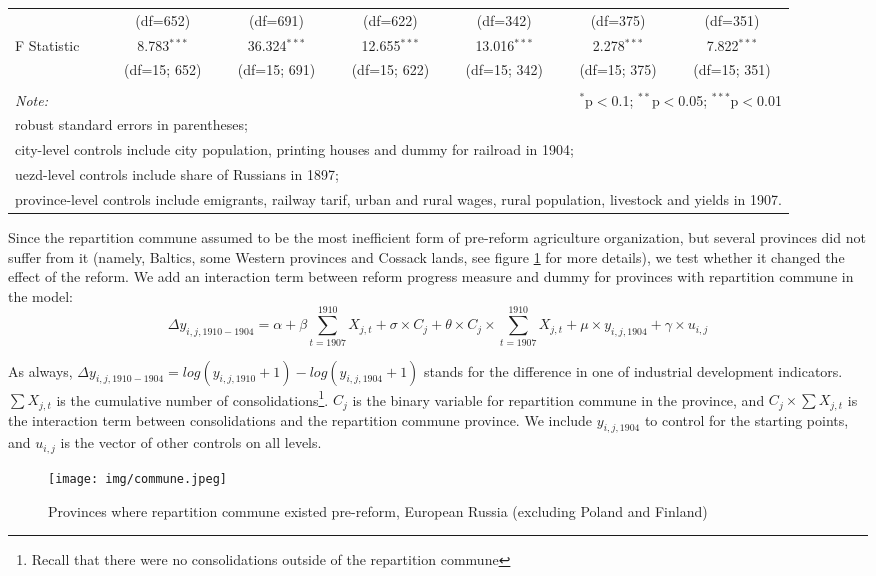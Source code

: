 \documentclass[a4paper, 12pt]{article}
\begin{document}
\begin{table}[!htbp]
{\begin{tabular}{@{\extracolsep{5pt}}lcccccc}
&(df=652)  & (df=691)  & (df=622)& (df=342) & (df=375) & (df=351) \\ 
F Statistic & 8.783$^{***}$ & 36.324$^{***}$ & 12.655$^{***}$ & 13.016$^{***}$ & 2.278$^{***}$ & 7.822$^{***}$ \\
& (df=15; 652) & (df=15; 691) & (df=15; 622) & (df=15; 342) & (df=15; 375) & (df=15; 351) \\ 
\hline 
\hline \\[-1.8ex] 
\textit{Note:}  & \multicolumn{6}{r}{$^{*}$p$<$0.1; $^{**}$p$<$0.05; $^{***}$p$<$0.01} \\ 
\multicolumn{7}{l}{robust standard errors in parentheses;} \\
\multicolumn{7}{l}{city-level controls include city population, printing houses and dummy for railroad in 1904;} \\
\multicolumn{7}{l}{uezd-level controls include share of Russians in 1897;}\\
\multicolumn{7}{l}{province-level controls include emigrants, railway tarif, urban and rural wages, rural population, livestock and yields in 1907.}
\end{tabular} 
}
\end{table} 

\noindent Since the repartition commune assumed to be the most inefficient form of pre-reform agriculture organization, but several provinces did not suffer from it (namely, Baltics, some Western provinces and Cossack lands, see figure \ref{fig:commune} for more details), we test whether it changed the effect of the reform. We add an interaction term between reform progress measure and dummy for provinces with repartition commune in the model:
\begin{equation}\label{eq:commune}
    \Delta y_{i,j,1910-1904} = \alpha + \beta \sum_{t=1907}^{1910} X_{j,t} + \sigma \times C_j + \theta \times C_j \times \sum_{t=1907}^{1910} X_{j,t} + \mu \times y_{i,j,1904}+ \gamma \times u_{i,j} 
\end{equation}

\noindent As always, $\Delta y_{i,j,1910-1904} = log(y_{i,j,1910}+1) - log(y_{i,j,1904}+1)$ stands for the difference in one of industrial development indicators. $\sum X_{j,t}$ is the cumulative number of consolidations\footnote{Recall that there were no consolidations outside of the repartition commune}. $C_j$ is the binary variable for repartition commune in the province, and $C_j \times \sum X_{j,t}$ is the interaction term between consolidations and the repartition commune province. We include $y_{i,j,1904}$ to control for the starting points, and $u_{i,j}$ is the vector of other controls on all levels.
\\
\begin{figure}[!htbp]
    \centering
    \texttt{[image: img/commune.jpeg]}
    \caption{Provinces where repartition commune existed pre-reform, European Russia (excluding Poland and Finland)}
    \label{fig:commune}
\end{figure}
\end{document}
